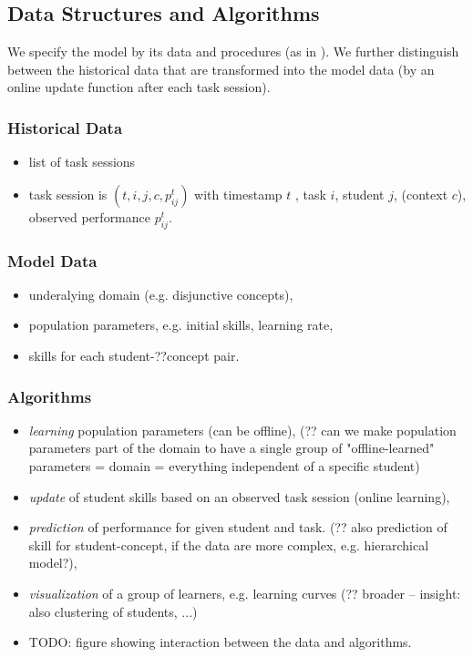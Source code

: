 \subsection{Data Structures and Algorithms}

We specify the model by its data and procedures
(as in \cite{pelanek-learner-modeling}).
We further distinguish between the historical data that are transformed into
the model data (by an online update function after each task session).

\subsubsection{Historical Data}
\begin{itemize}
\item list of task sessions
\item task session is $(t, i, j, c, p^{t}_{ij})$ with
  timestamp $t$ , task $i$, student $j$, (context $c$),
  observed performance $p^{t}_{ij}$.
\end{itemize}

\subsubsection{Model Data}
\begin{itemize}
\item underalying domain (e.g. disjunctive concepts),
\item population parameters, e.g. initial skills, learning rate,
\item skills for each student-??concept pair.
\end{itemize}

\subsubsection{Algorithms}
\begin{itemize}
\item \emph{learning} population parameters (can be offline),
  (?? can we make population parameters part of the domain to have a single
  group of "offline-learned" parameters = domain = everything independent
  of a specific student)
\item \emph{update} of student skills based on an observed task session
  (online learning),
\item \emph{prediction} of performance for given student and task.
  (?? also prediction of skill for student-concept,
  if the data are more complex, e.g. hierarchical model?),
\item \emph{visualization} of a group of learners, e.g. learning curves
  (?? broader -- insight: also clustering of students, ...)
\item TODO: figure showing interaction between the data and algorithms.
\end{itemize}

